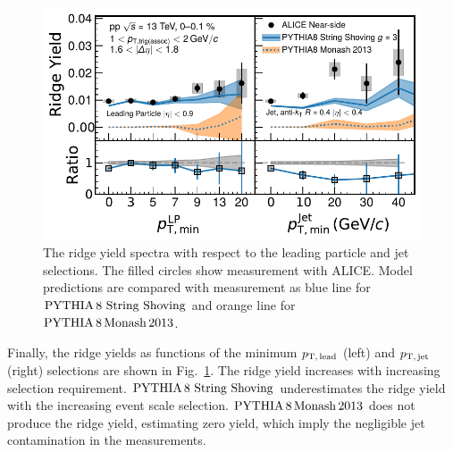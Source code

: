 \begin{figure}[h!]
	\centering
	\includegraphics[width=0.99\linewidth]{./figures/Fig6_RidgeYieldESE.pdf}
	\caption{The ridge yield spectra with respect to the leading particle and jet selections. The filled circles show measurement with ALICE. Model predictions are compared with measurement as blue line for $\mathrm{PYTHIA}\,8~\mathrm{String}~\mathrm{Shoving}$ and orange line for $\mathrm{PYTHIA}\,8\,\mathrm{Monash}\,2013$.}
	\label{fig:RidgeYield_ESE}
\end{figure}

Finally, the ridge yields as functions of the minimum $p_\mathrm{T,\,lead}$ (left) and $p_\mathrm{T,\,jet}$ (right) selections are shown in Fig.~\ref{fig:RidgeYield_ESE}. The ridge yield increases with increasing selection requirement. $\mathrm{PYTHIA}\,8~\mathrm{String}~\mathrm{Shoving}$ underestimates the ridge yield with the increasing event scale selection. $\mathrm{PYTHIA}\,8\,\mathrm{Monash}\,2013$ does not produce the ridge yield, estimating zero yield, which imply the negligible jet contamination in the measurements.


